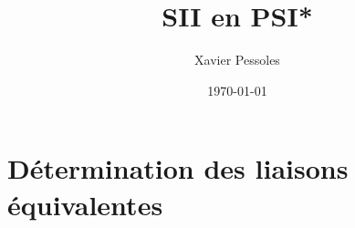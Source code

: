 \documentclass[
	fontsize=10pt, %
	twoside=true, %
]{kaobook}
\newcommand{\repRel}{../../..}
\newcommand{\repStyle}{\repRel/Style}
\begin{document}

\titlehead{Document Template}
\title[SII en PSI*]{SII en PSI*}
\author[XP]{Xavier Pessoles}
\date{\today}

%
\frontmatter %
%

%

%
\mainmatter %



\setcounter{margintocdepth}{\sectiontocdepth}
\marginlayout
\graphicspath{{\repStyle/png}}

\pagestyle{xp.scrheadings}


%



\newcommand{\repExo}{Application_01_ROV}
\newcommand{\nomExo}{Application_01_ROV}

\livrettrue %
\collefalse


\setcounter{chapter}{3}
%
%
\setchapterpreamble[u]{\margintoc}

\chapter{Détermination des liaisons équivalentes}


\end{document}
